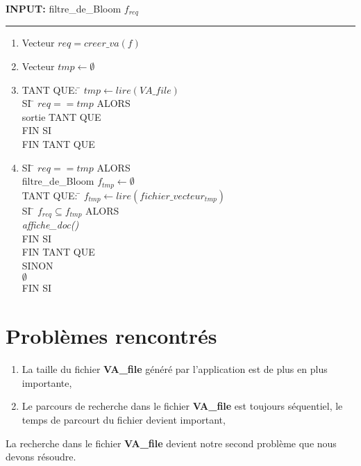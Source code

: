 \documentclass[a4paper,12pt]{report}
\begin{document}
\begin{flushleft}
	\begin{framed}
		\textbf{INPUT:} filtre\_de\_Bloom $f_{req}$
		\noindent\rule{\linewidth}{0.5pt}
		\begin{enumerate}
			\item Vecteur $req = creer\_va(f) $
			\item Vecteur $tmp \leftarrow \emptyset$
			\item
			\begin{tabbing}
				TANT QUE: \= $tmp \leftarrow lire(VA\_file)$\\
					\> SI \= $req == tmp$ ALORS\\
					\> \> sortie TANT QUE\\
					\> FIN SI\\
				FIN TANT QUE
			\end{tabbing}
			\item 
			\begin{tabbing}
				SI \= $req == tmp$ ALORS\\
				\> filtre\_de\_Bloom $f_{tmp} \leftarrow \emptyset $\\
				\> TANT QUE: \= $f_{tmp} \leftarrow lire(fichier\_vecteur_{tmp})$\\
				\> \> SI \= $f_{req} \subseteq f_{tmp}$ ALORS\\
				\> \> \> \textit{affiche\_doc()} \\
				\> \> FIN SI\\
				\> FIN TANT QUE\\
				SINON\\
				\> $\emptyset$\\
				FIN SI
			\end{tabbing}
		\end{enumerate}	
	\end{framed}
\end{flushleft}

\section{Problèmes rencontrés}
\begin{enumerate}
	\item La taille du fichier \textbf{VA\_file} généré par l'application est de plus en plus importante,
	\item Le parcours de recherche dans le fichier \textbf{VA\_file} est toujours séquentiel, le temps de parcourt du fichier devient important,
\end{enumerate}
	La recherche dans le fichier \textbf{VA\_file} devient notre second problème que nous devons résoudre.
\end{document}
